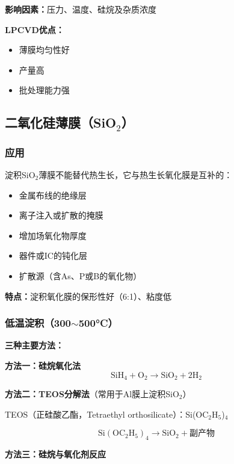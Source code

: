 \documentclass[UTF8,12pt,a4paper]{ctexart}
\begin{document}
\textbf{影响因素：}压力、温度、硅烷及杂质浓度

\textbf{LPCVD优点：}
\begin{itemize}
    \item 薄膜均匀性好
    \item 产量高
    \item 批处理能力强
\end{itemize}

\subsection{二氧化硅薄膜（SiO$_2$）}

\subsubsection{应用}

淀积SiO$_2$薄膜不能替代热生长，它与热生长氧化膜是互补的：

\begin{itemize}
    \item 金属布线的绝缘层
    \item 离子注入或扩散的掩膜
    \item 增加场氧化物厚度
    \item 器件或IC的钝化层
    \item 扩散源（含As、P或B的氧化物）
\end{itemize}

\textbf{特点：}淀积氧化膜的保形性好（6:1）、粘度低

\subsubsection{低温淀积（300$\sim$500°C）}

\textbf{三种主要方法：}

\textbf{方法一：硅烷氧化法}
\begin{equation}
\text{SiH}_4 + \text{O}_2 \rightarrow \text{SiO}_2 + 2\text{H}_2
\end{equation}

\textbf{方法二：TEOS分解法}（常用于Al膜上淀积SiO$_2$）

TEOS（正硅酸乙酯，Tetraethyl orthosilicate）：Si(OC$_2$H$_5$)$_4$

\begin{equation}
\text{Si}(\text{OC}_2\text{H}_5)_4 \rightarrow \text{SiO}_2 + \text{副产物}
\end{equation}

\textbf{方法三：硅烷与氧化剂反应}
\end{document}

